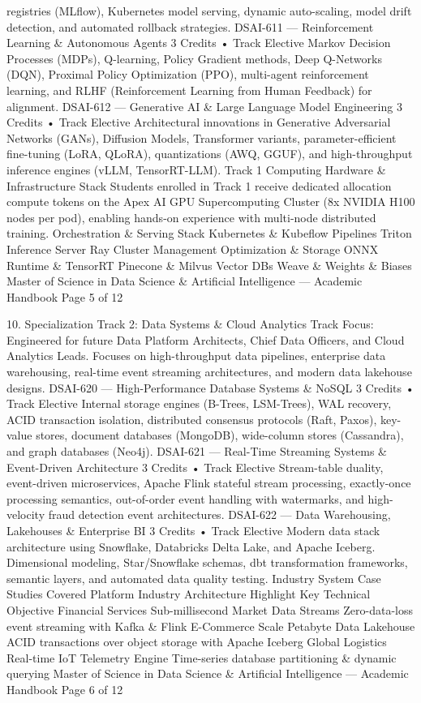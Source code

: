 registries (MLflow), Kubernetes model serving, dynamic auto-scaling, model drift detection, and automated
rollback strategies.
DSAI-611 — Reinforcement Learning \& Autonomous Agents
3 Credits • Track Elective
Markov Decision Processes (MDPs), Q-learning, Policy Gradient methods, Deep Q-Networks (DQN), Proximal
Policy Optimization (PPO), multi-agent reinforcement learning, and RLHF (Reinforcement Learning from Human
Feedback) for alignment.
DSAI-612 — Generative AI \& Large Language Model Engineering
3 Credits • Track Elective
Architectural innovations in Generative Adversarial Networks (GANs), Diffusion Models, Transformer variants,
parameter-efficient fine-tuning (LoRA, QLoRA), quantizations (AWQ, GGUF), and high-throughput inference
engines (vLLM, TensorRT-LLM).
Track 1 Computing Hardware \& Infrastructure Stack
Students enrolled in Track 1 receive dedicated allocation compute tokens on the Apex AI GPU Supercomputing
Cluster (8x NVIDIA H100 nodes per pod), enabling hands-on experience with multi-node distributed training.
Orchestration \& Serving Stack
Kubernetes \& Kubeflow Pipelines
Triton Inference Server
Ray Cluster Management
Optimization \& Storage
ONNX Runtime \& TensorRT
Pinecone \& Milvus Vector DBs
Weave \& Weights \& Biases
Master of Science in Data Science \& Artificial Intelligence — Academic Handbook
Page 5 of 12

10. Specialization Track 2: Data Systems \& Cloud Analytics
Track Focus: Engineered for future Data Platform Architects, Chief Data Officers, and Cloud Analytics Leads.
Focuses on high-throughput data pipelines, enterprise data warehousing, real-time event streaming
architectures, and modern data lakehouse designs.
DSAI-620 — High-Performance Database Systems \& NoSQL
3 Credits • Track Elective
Internal storage engines (B-Trees, LSM-Trees), WAL recovery, ACID transaction isolation, distributed consensus
protocols (Raft, Paxos), key-value stores, document databases (MongoDB), wide-column stores (Cassandra), and
graph databases (Neo4j).
DSAI-621 — Real-Time Streaming Systems \& Event-Driven Architecture
3 Credits • Track Elective
Stream-table duality, event-driven microservices, Apache Flink stateful stream processing, exactly-once
processing semantics, out-of-order event handling with watermarks, and high-velocity fraud detection event
architectures.
DSAI-622 — Data Warehousing, Lakehouses \& Enterprise BI
3 Credits • Track Elective
Modern data stack architecture using Snowflake, Databricks Delta Lake, and Apache Iceberg. Dimensional
modeling, Star/Snowflake schemas, dbt transformation frameworks, semantic layers, and automated data
quality testing.
Industry System Case Studies Covered
Platform Industry
Architecture Highlight
Key Technical Objective
Financial Services
Sub-millisecond Market Data Streams
Zero-data-loss event streaming with Kafka \& Flink
E-Commerce Scale
Petabyte Data Lakehouse
ACID transactions over object storage with Apache Iceberg
Global Logistics
Real-time IoT Telemetry Engine
Time-series database partitioning \& dynamic querying
Master of Science in Data Science \& Artificial Intelligence — Academic Handbook
Page 6 of 12

